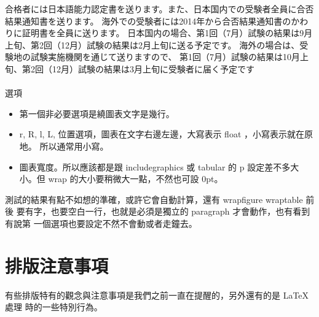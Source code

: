 合格者には日本語能力認定書を送ります。また、日本国内での受験者全員に合否結果通知書を送ります。
海外での受験者には2014年から合否結果通知書のかわりに証明書を全員に送ります。
日本国内の場合、第1回（7月）試験の結果は9月上旬、第2回（12月）試験の結果は2月上旬に送る予定です。
海外の場合は、受験地の試験実施機関を通じて送りますので、
第1回（7月）試験の結果は10月上旬、第2回（12月）試験の結果は3月上旬に受験者に届く予定です
\\\\
選項
\begin{itemize}
\item 第一個非必要選項是繞圖表文字是幾行。
\item r, R, l, L,  位置選項，圖表在文字右邊左邊，大寫表示 float ，小寫表示就在原地。
所以通常用小寫。
\item 圖表寬度。所以應該都是跟 includegraphics 或 tabular 的 p 設定差不多大小。但
wrap 的大小要稍微大一點，不然也可設 0pt。
\end{itemize}
測試的結果有點不如想的準確，或許它會自動計算，還有 wrapfigure wraptable 前後
要有字，也要空白一行，也就是必須是獨立的 paragraph 才會動作，也有看到有說第
一個選項也要設定不然不會動或者走鐘去。

\section{排版注意事項}
有些排版特有的觀念與注意事項是我們之前一直在提醒的，另外還有的是 {\LaTeX} 處理
時的一些特別行為。
